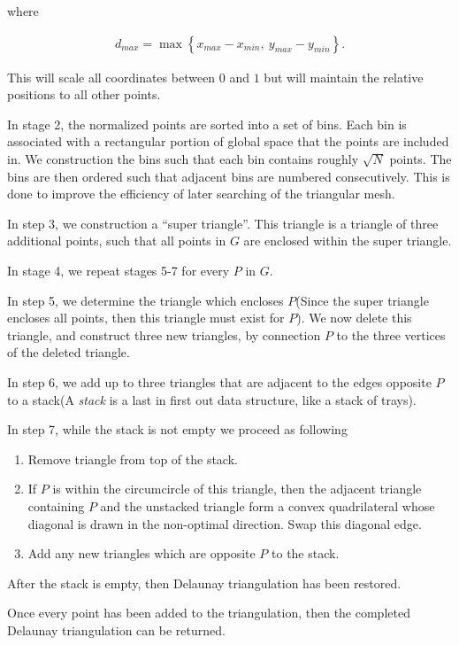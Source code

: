 \documentclass[../fem.tex]{subfiles}
\begin{document}
where

\begin{align*}
  d_{max}=\max\left\{x_{max}-x_{min},\ y_{max}-y_{min}\right\}.
\end{align*}

This will scale all coordinates between $0$ and $1$ but will maintain the
relative positions to all other points.

In stage 2, the normalized points are sorted into a set of bins. Each bin is
associated with a rectangular portion of global space that the points are
included in. We construction the bins such that each bin contains roughly
$\sqrt{N}$ points. The bins are then ordered such that adjacent bins are
numbered consecutively. This is done to improve the efficiency of later
searching of the triangular mesh.

In step 3, we construction a ``super triangle''. This triangle is a triangle of
three additional points, such that all points in $G$ are enclosed within the
super triangle.

In stage 4, we repeat stages 5-7 for every $P$ in $G$.

In step 5, we determine the triangle which encloses $P$(Since the super
triangle encloses all points, then this triangle must exist for $P$). We now
delete this triangle, and construct three new triangles, by connection $P$ to
the three vertices of the deleted triangle.

In step 6, we add up to three triangles that are adjacent to the edges opposite
$P$ to a stack(A \textit{stack} is a last in first out data structure, like a
stack of trays).

In step 7, while the stack is not empty we proceed as following

\begin{enumerate}[label=7.\arabic*.]
  \item Remove triangle from top of the stack.
  \item If $P$ is within the circumcircle of this triangle, then the adjacent
    triangle containing $P$ and the unstacked triangle form a convex
    quadrilateral whose diagonal is drawn in the non-optimal direction. Swap
    this diagonal edge.
  \item Add any new triangles which are opposite $P$ to the stack.
\end{enumerate}

After the stack is empty, then Delaunay triangulation has been restored.

Once every point has been added to the triangulation, then the completed
Delaunay triangulation can be returned.
\end{document}
